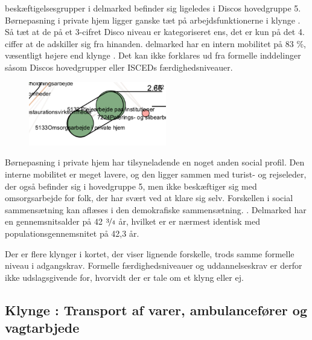 beskæftigelsesgrupper i delmarked  befinder sig ligeledes i Discos hovedgruppe 5. Børnepasning i private hjem ligger ganske tæt på arbejdsfunktionerne i klynge . Så tæt at de på et 3-cifret Disco niveau er kategoriseret ens, det er kun på det 4. ciffer at de adskiller sig fra hinanden. delmarked  har en intern mobilitet på 83 \%, væsentligt højere end klynge . Det kan ikke forklares ud fra formelle inddelinger såsom Discos hovedgrupper eller ISCEDs færdighedsniveauer.

%
\begin{figure}
  \vspace{-20pt}
  \begin{center}
    \includegraphics[width=6cm]{fig/segzoom/seg_2_66.pdf}
   \caption{}
   \label{fig_delanalyse1_zoom_2_66}
  \end{center}
  \vspace{-20pt}
\end{figure}
%

Børnepasning i private hjem har tilsyneladende en noget anden social profil. Den interne mobilitet er meget lavere, og den ligger sammen med turist- og rejseleder, der også befinder sig i hovedgruppe 5, men ikke beskæftiger sig med omsorgsarbejde for folk, der har svært ved at klare sig selv. Forskellen i social sammensætning kan aflæses i den demokrafiske sammensætning. 
%
. Delmarked  har en gennemsnitsalder på 42 $\nicefrac{3}{4}$ år, hvilket er er nærmest identisk med populationsgennemsnitet på 42,3 år. %



Der er flere klynger i kortet, der viser lignende forskelle, trods samme formelle niveau i adgangskrav. Formelle færdighedsniveauer og uddannelseskrav er derfor ikke udslagsgivende for, hvorvidt der er tale om et klyng eller ej. %


\subsection{Klynge : Transport af varer, ambulancefører og vagtarbjede}


